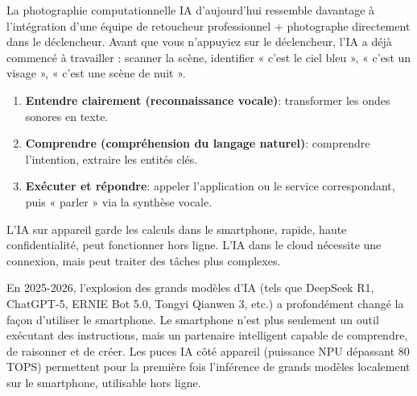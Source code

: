 


La photographie computationnelle IA d'aujourd'hui ressemble davantage à l'intégration d'une équipe de retoucheur professionnel + photographe directement dans le déclencheur. Avant que vous n'appuyiez sur le déclencheur, l'IA a déjà commencé à travailler : scanner la scène, identifier « c'est le ciel bleu », « c'est un visage », « c'est une scène de nuit ».


\begin{enumerate}
  \item \textbf{Entendre clairement (reconnaissance vocale)}: transformer les ondes sonores en texte.
  \item \textbf{Comprendre (compréhension du langage naturel)}: comprendre l'intention, extraire les entités clés.
  \item \textbf{Exécuter et répondre}: appeler l'application ou le service correspondant, puis « parler » via la synthèse vocale.
\end{enumerate}


L'IA sur appareil garde les calculs dans le smartphone, rapide, haute confidentialité, peut fonctionner hors ligne. L'IA dans le cloud nécessite une connexion, mais peut traiter des tâches plus complexes.


En 2025-2026, l'explosion des grands modèles d'IA (tels que DeepSeek R1, ChatGPT-5, ERNIE Bot 5.0, Tongyi Qianwen 3, etc.) a profondément changé la façon d'utiliser le smartphone. Le smartphone n'est plus seulement un outil exécutant des instructions, mais un partenaire intelligent capable de comprendre, de raisonner et de créer. Les puces IA côté appareil (puissance NPU dépassant 80 TOPS) permettent pour la première fois l'inférence de grands modèles localement sur le smartphone, utilisable hors ligne.

